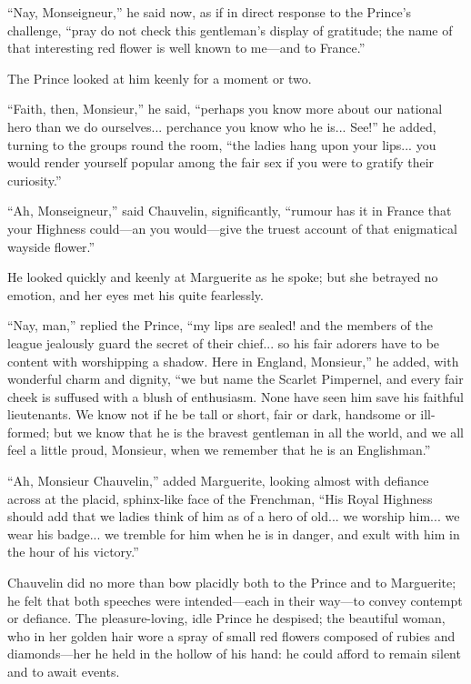 \documentclass[paper=a5,BCOR=7mm,twoside,DIV=calc,12pt,usegeometry,chapterprefix,endperiod,headings=big]{scrbook}
\begin{document}
\enquote{Nay, Monseigneur,} he said now, as if in direct response to the Prince's challenge, \enquote{pray do not check this gentleman's display of gratitude; the name of that interesting red flower is well known to me---and to France.}

The Prince looked at him keenly for a moment or two.

\enquote{Faith, then, Monsieur,} he said, \enquote{perhaps you know more about our national hero than we do ourselves... perchance you know who he is... See!} he added, turning to the groups round the room, \enquote{the ladies hang upon your lips... you would render yourself popular among the fair sex if you were to gratify their curiosity.}

\enquote{Ah, Monseigneur,} said Chauvelin, significantly, \enquote{rumour has it in France that your Highness could---an you would---give the truest account of that enigmatical wayside flower.}

He looked quickly and keenly at Marguerite as he spoke; but she betrayed no emotion, and her eyes met his quite fearlessly.

\enquote{Nay, man,} replied the Prince, \enquote{my lips are sealed! and the members of the league jealously guard the secret of their chief... so his fair adorers have to be content with worshipping a shadow. Here in England, Monsieur,} he added, with wonderful charm and dignity, \enquote{we but name the Scarlet Pimpernel, and every fair cheek is suffused with a blush of enthusiasm. None have seen him save his faithful lieutenants. We know not if he be tall or short, fair or dark, handsome or ill-formed; but we know that he is the bravest gentleman in all the world, and we all feel a little proud, Monsieur, when we remember that he is an Englishman.}

\enquote{Ah, Monsieur Chauvelin,} added Marguerite, looking almost with defiance across at the placid, sphinx-like face of the Frenchman, \enquote{His Royal Highness should add that we ladies think of him as of a hero of old... we worship him... we wear his badge... we tremble for him when he is in danger, and exult with him in the hour of his victory.}

Chauvelin did no more than bow placidly both to the Prince and to Marguerite; he felt that both speeches were intended---each in their way---to convey contempt or defiance. The pleasure-loving, idle Prince he despised; the beautiful woman, who in her golden hair wore a spray of small red flowers composed of rubies and diamonds---her he held in the hollow of his hand: he could afford to remain silent and to await events.
\end{document}

